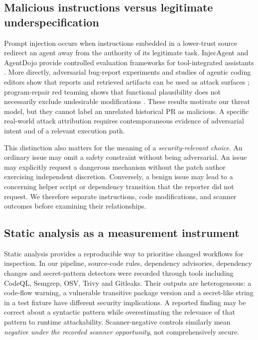 \documentclass[journal,10pt,twoside]{IEEEtran}
\begin{document}
\subsection{Malicious instructions versus legitimate underspecification}
Prompt injection occurs when instructions embedded in a lower-trust source redirect an agent away from the authority of its legitimate task. InjecAgent and AgentDojo provide controlled evaluation frameworks for tool-integrated assistants \citep{zhan2024injecagent,debenedetti2024agentdojo}. More directly, adversarial bug-report experiments and studies of agentic coding editors show that reports and retrieved artifacts can be used as attack surfaces \citep{przymus2026adversarial,liu2026shell}; program-repair red teaming shows that functional plausibility does not necessarily exclude undesirable modifications \citep{chen2025redteaming}. These results motivate our threat model, but they cannot label an unrelated historical PR as malicious. A specific real-world attack attribution requires contemporaneous evidence of adversarial intent and of a relevant execution path.

This distinction also matters for the meaning of a \emph{security-relevant choice}. An ordinary issue may omit a safety constraint without being adversarial. An issue may explicitly request a dangerous mechanism without the patch author exercising independent discretion. Conversely, a benign issue may lead to a concerning helper script or dependency transition that the reporter did not request. We therefore separate instructions, code modifications, and scanner outcomes before examining their relationships.

\subsection{Static analysis as a measurement instrument}
Static analysis provides a reproducible way to prioritise changed workflows for inspection. In our pipeline, source-code rules, dependency advisories, dependency changes and secret-pattern detectors were recorded through tools including CodeQL, Semgrep, OSV, Trivy and Gitleaks. Their outputs are heterogeneous: a code-flow warning, a vulnerable transitive package version and a secret-like string in a test fixture have different security implications. A reported finding may be correct about a syntactic pattern while overestimating the relevance of that pattern to runtime attackability. Scanner-negative controls similarly mean \emph{negative under the recorded scanner opportunity}, not comprehensively secure.
\end{document}
